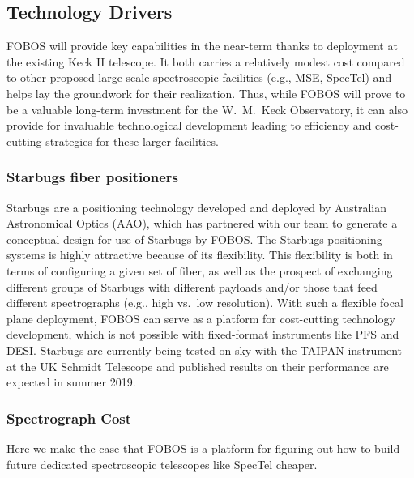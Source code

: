 

\subsection{Technology Drivers}
\label{sec:design}

FOBOS will provide key capabilities in the near-term thanks to
deployment at the existing Keck II telescope. It both carries a
relatively modest cost compared to other proposed large-scale
spectroscopic facilities (e.g., MSE, SpecTel) and helps lay the
groundwork for their realization. Thus, while FOBOS will prove to be
a valuable long-term investment for the W.~M.~Keck Observatory, it
can also provide for invaluable technological development leading to
efficiency and cost-cutting strategies for these larger facilities.

\subsubsection{Starbugs fiber positioners} Starbugs are a positioning
technology developed and deployed by Australian Astronomical Optics
(AAO), which has partnered with our team to generate a conceptual
design for use of Starbugs by FOBOS. The Starbugs positioning systems
is highly attractive because of its flexibility. This flexibility is
both in terms of configuring a given set of fiber, as well as the
prospect of exchanging different groups of Starbugs with different
payloads and/or those that feed different spectrographs (e.g., high
vs.\ low resolution). With such a flexible focal plane deployment,
FOBOS can serve as a platform for cost-cutting technology
development, which is not possible with fixed-format instruments like
PFS and DESI. Starbugs are currently being tested on-sky with the
TAIPAN instrument at the UK Schmidt Telescope and published results
on their performance are expected in summer 2019.

\subsubsection{Spectrograph Cost}  Here we make the
case that FOBOS is a platform for figuring out how to build future
dedicated spectroscopic telescopes like SpecTel cheaper.

